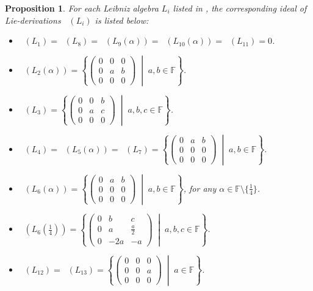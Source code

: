 \documentclass[11pt,a4paper]{amsart}
\theoremstyle{plain}
\newtheorem{proposition}[subsection]{Proposition}
\theoremstyle{definition}
\theoremstyle{remark}
\numberwithin{equation}{section}
\newcommand{\0}{\emptyset}
\newcommand{\bF}{\mathbb{F}}
\DeclareMathOperator{\DerL}{Der_{Lie}}
\begin{document}
\begin{proposition}\label{pro_der}
	For each Leibniz algebra $L_i$ listed in , the corresponding ideal of Lie-derivations $\DerL(L_i)$ is listed below:
	\begin{itemize}[itemsep=0.5em]
		\item $\DerL(L_1)=\DerL(L_8)=\DerL(L_9(\alpha))=\DerL(L_{10}(\alpha))=\DerL(L_{11})=0$.
		\item  $\DerL(L_2(\alpha))=\left\{\begin{pmatrix}
		      0 & 0 & 0 \\
		      0 & a & b \\
		      0 & 0 & 0 
		\end{pmatrix} \; \middle| \; a,b\in\bF\right\}$.
		\item  $\DerL(L_3)=\left\{\begin{pmatrix}
		      0 & 0 & b \\
		      0 & a & c \\
		      0 & 0 & 0
		\end{pmatrix} \; \middle| \; a,b,c\in\bF\right\}$.
		\item  $\DerL(L_4)=\DerL(L_5(\alpha))=\DerL(L_7)=\left\{\begin{pmatrix}
		      0 & a & b \\
		      0 & 0 & 0 \\
		      0 & 0 & 0 
		\end{pmatrix} \; \middle| \; a,b \in\bF\right\}$.
		\item  $\DerL(L_6(\alpha))=\left\{\begin{pmatrix}
		      0 & a & b \\
		      0 & 0 & 0 \\
		      0 & 0 & 0 
		\end{pmatrix} \; \middle| \; a,b \in\bF\right\}$, for any $\alpha \in \bF \setminus \lbrace \frac{1}{4}\rbrace$.
		\item  $\DerL(L_6\left(\tfrac{1}{4}\right))=\left\{\begin{pmatrix}
		      0 & b & c \\
		      0 & a & \frac{a}{2} \\
		      0 & -2a & -a 
		\end{pmatrix} \; \middle| \; a,b,c\in\bF\right\}$.
		\item  $\DerL(L_{12})=\DerL(L_{13})=\left\{\begin{pmatrix}
		      0 & 0 & 0 \\
		      0 & 0 & a \\
		      0 & 0 & 0 
		\end{pmatrix} \; \middle| \; a\in\bF\right\}$.
	\end{itemize}
\end{proposition}
\end{document}
